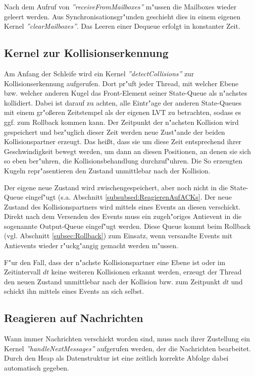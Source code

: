 \documentclass[a4paper, 10pt, openright, parskip, chapterprefix]{scrreprt}
\begin{document}
Nach dem Aufruf von \emph{''receiveFromMailboxes''} m"ussen die Mailboxes wieder geleert werden. Aus
Synchronisationsgr"unden geschieht dies in einem eigenen Kernel \emph{''clearMailboxes''}. Das Leeren einer Dequeue
erfolgt in konstanter Zeit.


\subsection{Kernel zur Kollisionserkennung}
\label{subsec:KernelZurKollisionserkennung}
Am Anfang der Schleife wird ein Kernel \emph{''detectCollisions''} zur Kollisionserkennung aufgerufen. Dort pr"uft jeder Thread, mit welcher Ebene
bzw. welcher anderen Kugel das Front-Element seiner State-Queue als n"achstes kollidiert. Dabei ist
darauf zu achten, alle Eintr"age der anderen State-Queues mit einem
gr"o\ss eren Zeitstempel als der eigenen LVT zu betrachten, sodass es ggf. zum Rollback kommen kann. Der Zeitpunkt der n"achsten
Kollision wird gespeichert und bez"uglich dieser Zeit werden neue Zust"ande der beiden Kollisionspartner erzeugt. Das
hei\ss t, dass sie um diese Zeit entsprechend ihrer Geschwindigkeit bewegt werden, um dann an diesen Positionen, an
denen sie sich so eben ber"uhren, die Kollisionsbehandlung
durchzuf"uhren. Die So erzeugten Kugeln repr"asentieren den Zustand unmittlebar nach der Kollision.

Der eigene neue Zustand wird zwischengespeichert, aber noch nicht in die State-Queue eingef"ugt (s.a. Abschnitt
\ref{subsubsed:ReagierenAufACKs}. Der neue
Zustand des Kollisionspartners wird mittels eines Events an diesen verschickt. Direkt nach dem Versenden des Events muss
ein zugeh"origes Antievent in die sogenannte Output-Queue eingef"ugt werden. Diese Queue kommt beim Rollback (vgl.
Abschnitt \ref{subsec:Rollback}) zum Einsatz, wenn versandte Events mit Antievents wieder r"uckg"angig gemacht werden
m"ussen.

F"ur den Fall, dass der n"achste Kollisionspartner eine Ebene ist oder im Zeitintervall $dt$ keine weiteren Kollisionen
erkannt werden, erzeugt der Thread den neuen Zustand unmittlebar nach der Kollision bzw. zum Zeitpunkt $dt$ und schickt
ihn mittels eines Events an sich selbst.

\subsection{Reagieren auf Nachrichten}
Wann immer Nachrichten verschickt worden sind, muss nach ihrer Zustellung ein Kernel \emph{''handleNextMessages''} aufgerufen werden, der die
Nachrichten bearbeitet. Durch den Heap als Datenstruktur ist eine zeitlich korrekte Abfolge dabei automatisch gegeben.
\end{document}
